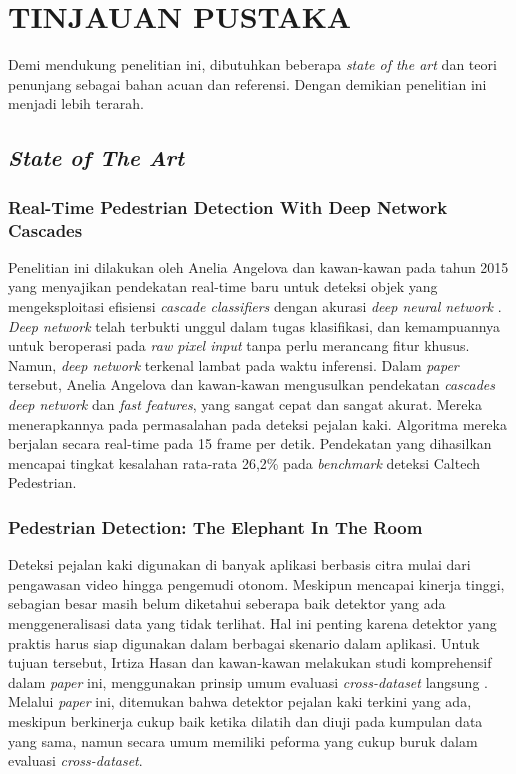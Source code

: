 \chapter{TINJAUAN PUSTAKA}
\label{chap:tinjauanpustaka}


Demi mendukung penelitian ini, dibutuhkan beberapa \textit{state of the art} dan teori penunjang sebagai bahan acuan dan referensi. Dengan demikian penelitian ini menjadi lebih terarah.

\section{\textit{State of The Art}}
\label{penelitianterkait}

\subsection{Real-Time Pedestrian Detection With Deep Network Cascades}
\label{realtime-pedestrian}

Penelitian ini dilakukan oleh Anelia Angelova dan kawan-kawan pada tahun 2015 yang menyajikan pendekatan real-time baru untuk deteksi objek yang mengeksploitasi efisiensi \textit{cascade classifiers} dengan akurasi \textit{deep neural network} \citep{penelitianterkait1}. \textit{Deep network} telah terbukti unggul dalam tugas klasifikasi, dan kemampuannya untuk beroperasi pada \textit{raw pixel input} tanpa perlu merancang fitur khusus. Namun, \textit{deep network} terkenal lambat pada waktu inferensi. Dalam \textit{paper} tersebut, Anelia Angelova dan kawan-kawan mengusulkan pendekatan \textit{cascades deep network} dan \textit{fast features}, yang sangat cepat dan sangat akurat. Mereka menerapkannya pada permasalahan pada deteksi pejalan kaki. Algoritma mereka berjalan secara real-time pada 15 frame per detik. Pendekatan yang dihasilkan mencapai tingkat kesalahan rata-rata 26,2\% pada \textit{benchmark} deteksi Caltech Pedestrian.

\subsection{Pedestrian Detection: The Elephant In The Room}
\label{pedestrian-detection}

Deteksi pejalan kaki digunakan di banyak aplikasi berbasis citra mulai dari pengawasan video hingga pengemudi otonom. Meskipun mencapai kinerja tinggi, sebagian besar masih belum diketahui seberapa baik detektor yang ada menggeneralisasi data yang tidak terlihat. Hal ini penting karena detektor yang praktis harus siap digunakan dalam berbagai skenario dalam aplikasi. Untuk tujuan tersebut, Irtiza Hasan dan kawan-kawan melakukan studi komprehensif dalam \textit{paper} ini, menggunakan prinsip umum evaluasi \textit{cross-dataset} langsung \citep{pedestrian-detection}. Melalui \textit{paper} ini, ditemukan bahwa detektor pejalan kaki terkini yang ada, meskipun berkinerja cukup baik ketika dilatih dan diuji pada kumpulan data yang sama, namun secara umum memiliki peforma yang cukup buruk dalam evaluasi \textit{cross-dataset}. 

